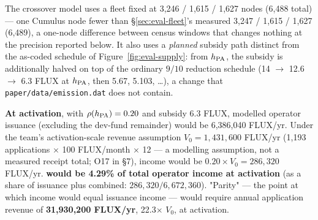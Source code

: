 The crossover model uses a fleet fixed at 3,246 / 1,615 / 1,627 nodes (6,488 total) — one Cumulus
node fewer than \S\ref{sec:eval-fleet}'s measured 3,247 / 1,615 / 1,627 (6,489), a one-node
difference between census windows that changes nothing at the precision reported below. It also
uses a \emph{planned} subsidy path distinct from the as-coded schedule of Figure~\ref{fig:eval-supply}:
from $h_{\mathrm{PA}}$, the \PoN subsidy is additionally halved on top of the ordinary $9/10$ reduction
schedule (14 $\to$ 12.6 $\to$ 6.3 FLUX at $h_{\mathrm{PA}}$, then 5.67, 5.103, \ldots), a change that
\texttt{paper/\allowbreak{}data/\allowbreak{}emission.\allowbreak{}dat} does not contain.

\textbf{At activation}, with $\rho(h_{\mathrm{PA}}) = 0.20$ and subsidy 6.3 FLUX, modelled operator
issuance (excluding the dev-fund remainder) would be 6,386,040 FLUX/yr. Under the team's activation-scale
revenue assumption $V_0 = 1{,}431{,}600$ FLUX/yr (1,193 applications $\times$ 100 FLUX/month
$\times$ 12 — a modelling assumption, not a measured receipt total; O17 in \S7), \PNR income would
be $0.20 \times V_0 = 286{,}320$ FLUX/yr. \textbf{\PNR would be 4.29\% of total operator income at
activation} (\PNR as a share of \PoN issuance plus \PNR combined: $286{,}320 / 6{,}672{,}360$).
"Parity" — the point at which \PNR income would equal \PoN issuance income — would require annual
application revenue of \textbf{31,930,200 FLUX/yr}, 22.3$\times$ $V_0$, at activation.

